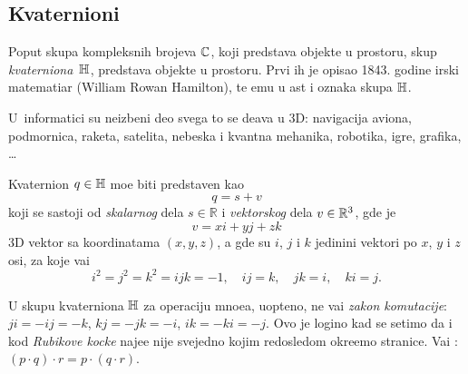 \subsection{Kvaternioni}

\def\uv{{u}}
\def\vp{{v}}
\def\norm#1{{\vert#1\vert}}
\def\con#1{{\bar#1}}

Poput skupa kompleksnih brojeva ${\mathbb C}$, koji predstav{\lj}a objekte u  prostoru,
skup {\sl kvater\-niona\/}~${\mathbb H}$, predstav{\lj}a objekte u  prostoru. Prvi ih je opisao 
1843. godine irski ma\-te\-ma\-ti\-{\cv}ar
 (William Rowan Hamilton), te {\nj}emu u {\cv}ast i oznaka skupa ${\mathbb H}$.

U~informatici su neizbe{\zv}ni deo svega {\sv}to se de{\sv}ava u 3D:
navigacija aviona, pod\-mor\-nica, raketa, satelita,
nebeska i kvantna mehanika, robotika, igre, grafika, \dots

\medskip

Kvaternion $q\in{\mathbb H}$ mo{\zv}e biti predstav{\lj}en kao 
\begin{equation}
    q=s+\vp
\end{equation}
koji se sastoji od {\sl skalarnog\/} dela $s\in{\mathbb R}$ i {\sl vektorskog\/} dela $\vp\in\Rset^3$, gde je
\begin{equation}
    \vp=xi+yj+zk
\end{equation}
3D vektor sa koordinatama $(x,y,z)$, 
a gde su $i$, $j$ i $k$ jedini{\cv}ni vektori po $x$, $y$ i $z$ osi,
za koje va{\zv}i
\begin{equation}\label{eq:qunits}
    i^2=j^2=k^2=ijk=-1,\quad
    ij=k,\quad jk=i,\quad ki=j. 
\end{equation}

\danger U skupu kvaterniona ${\mathbb H}$ za operaciju mno{\zv}e{\nj}a, uop{\sv}teno, ne va{\zv}i {\sl zakon komutacije}:
$ji=-ij=-k$, $kj=-jk=-i$, $ik=-ki=-j$.
Ovo je logi{\cv}no kad se setimo da i kod
{\sl Rubikove kocke\/} naj{\cv}e{\sv}{\cc}e nije svejedno kojim redosledom okre{\cc}emo stranice.
Va{\zv}i {\sl {}}: $(p\cdot q)\cdot r=p\cdot(q\cdot r)$.

\medskip

